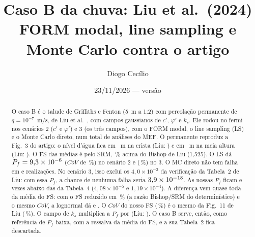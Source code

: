 \documentclass[11pt,a4paper]{article}
\title{Caso B da chuva: Liu et al.\ (2024)\\ FORM modal, line sampling e Monte Carlo contra o artigo}
\author{Diogo Cecílio}
\date{23/11/2026 --- versão \versao}
\begin{document}
\maketitle
\begin{abstract}
O caso B é o talude de Griffiths e Fenton (5~m a 1:2) com percolação permanente de $q = 10^{-7}$~m/s, de Liu et
al.~\cite{liu2024}, com campos gaussianos de $c'$, $\varphi'$ e $k_s$. Ele rodou no fermi nos cenários 2 ($c'$ e
$\varphi'$) e 3 (os três campos), com o FORM modal, o line sampling (LS) e o Monte Carlo direto, num total de \nTot{}
análises do MEF. O permanente reproduz a Fig.~3 do artigo: o nível d'água fica em \nivelXX{}~m na crista (Liu: \nivelLiuXX)
e em \nivelYY{}~m na meia altura (Liu: \nivelLiuYY). O FS das médias é \fsDet{} pelo SRM, \difDet\,\% acima do Bishop de
Liu (1,525). O LS dá $P_f = 9{,}3\times 10^{-6}$ ($CoV$ de \cvLSDois\,\%) no cenário 2 e \pfLSTres{} (\cvLSTres\,\%) no 3. O MC
direto não tem falha em \nMCDois{} e \nMCTres{} realizações. No cenário 3, isso exclui os $4{,}0 \times 10^{-3}$ da
verificação da Tabela~2 de Liu: com essa $P_f$, a chance de nenhuma falha seria $3{,}9\times 10^{-18}$. As nossas $P_f$
ficam \razaoTabQuatroDois{} e \razaoTabQuatroTres{} vezes abaixo das da Tabela~4 ($4{,}08 \times 10^{-5}$ e $1{,}19 \times 10^{-4}$). A diferença vem quase toda
da média do FS: com o FS reduzido em \difDetRel\,\% (a razão Bishop/SRM do determinístico) e o mesmo $CoV$, a lognormal
dá \pfLNredDois{} e \pfLNredTres. O $CoV$ do nosso FS (\cvDois\,\%) é o mesmo da Fig.~11 de Liu (\liuCvDois\,\%). O campo
de $k_s$ multiplica a $P_f$ por \razaoLS{} (Liu: \razaoTabQuatro). O caso B serve, então, como referência de $P_f$ baixa,
com a ressalva da média do FS, e a sua Tabela~2 fica descartada.
\end{abstract}
\tableofcontents
\end{document}
